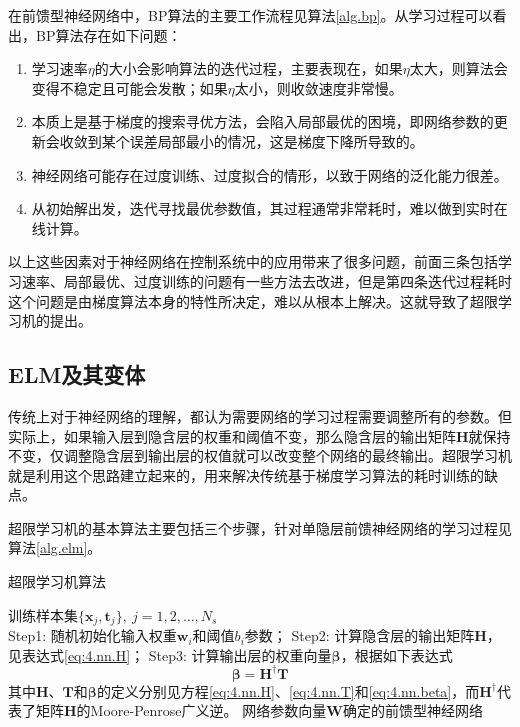 在前馈型神经网络中，BP算法的主要工作流程见算法\eqref{alg.bp}。从学习过程可以看出，BP算法存在如下问题：
\begin{enumerate}
\item 学习速率$\eta$的大小会影响算法的迭代过程，主要表现在，如果$\eta$太大，则算法会变得不稳定且可能会发散；如果$\eta$太小，则收敛速度非常慢。
\item 本质上是基于梯度的搜索寻优方法，会陷入局部最优的困境，即网络参数的更新会收敛到某个误差局部最小的情况，这是梯度下降所导致的。
\item 神经网络可能存在过度训练、过度拟合的情形，以致于网络的泛化能力很差。
\item 从初始解出发，迭代寻找最优参数值，其过程通常非常耗时，难以做到实时在线计算。
\end{enumerate}

以上这些因素对于神经网络在控制系统中的应用带来了很多问题，前面三条包括学习速率、局部最优、过度训练的问题有一些方法去改进，但是第四条迭代过程耗时这个问题是由梯度算法本身的特性所决定，难以从根本上解决。这就导致了超限学习机的提出。

\subsection{ELM及其变体}
传统上对于神经网络的理解，都认为需要网络的学习过程需要调整所有的参数。但实际上，如果输入层到隐含层的权重和阈值不变，那么隐含层的输出矩阵$\bm{H}$就保持不变，仅调整隐含层到输出层的权值就可以改变整个网络的最终输出。超限学习机就是利用这个思路建立起来的，用来解决传统基于梯度学习算法的耗时训练的缺点。

超限学习机的基本算法主要包括三个步骤，针对单隐层前馈神经网络的学习过程见算法\ref{alg.elm}。
\begin{algo}
\caption{超限学习机算法}
\label{alg.elm}
\begin{algorithmic}%
\REQUIRE 训练样本集$\{\bm{x}_{j},\bm{t}_{j}\},\ j=1,2,\ldots,N_{s}$\\
\STATE Step1: 随机初始化输入权重$\bm{w}_{i}$和阈值$b_{i}$参数；
\STATE Step2: 计算隐含层的输出矩阵$\bm{H}$，见表达式\eqref{eq:4.nn.H}；
\STATE Step3: 计算输出层的权重向量$\bm{\beta}$，根据如下表达式
\begin{equation}\label{eq:4.elm.beta}
\bm{\beta}=\bm{H}^{\dag}\bm{T}
\end{equation}
其中$\bm{H}$、$\bm{T}$和$\bm{\beta}$的定义分别见方程\eqref{eq:4.nn.H}、\eqref{eq:4.nn.T}和\eqref{eq:4.nn.beta}，而$\bm{H}^{\dag}$代表了矩阵$\bm{H}$的Moore-Penrose广义逆。
\ENSURE 网络参数向量$\bm{W}$确定的前馈型神经网络\\
\end{algorithmic}
\end{algo}

